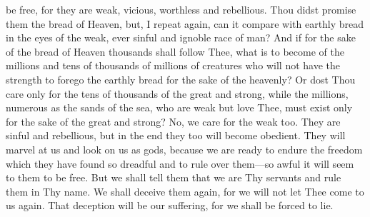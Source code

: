 be free, for they are weak, vicious, worthless and rebellious. Thou
didst promise them the bread of Heaven, but, I repeat again, can it
compare with earthly bread in the eyes of the weak, ever sinful and
ignoble race of man? And if for the sake of the bread of Heaven
thousands shall follow Thee, what is to become of the millions and
tens of thousands of millions of creatures who will not have the
strength to forego the earthly bread for the sake of the heavenly? Or
dost Thou care only for the tens of thousands of the great and strong,
while the millions, numerous as the sands of the sea, who are weak but
love Thee, must exist only for the sake of the great and strong? No,
we care for the weak too. They are sinful and rebellious, but in the
end they too will become obedient. They will marvel at us and look on
us as gods, because we are ready to endure the freedom which they have
found so dreadful and to rule over them---so awful it will seem to
them to be free. But we shall tell them that we are Thy servants and
rule them in Thy name. We shall deceive them again, for we will not
let Thee come to us again. That deception will be our suffering, for
we shall be forced to lie.

